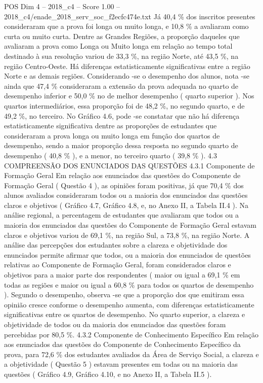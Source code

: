 \begin{textsample}{POS Dim 4 – 2018\_c4 – Score 1.00 – 2018\_c4/enade\_2018\_serv\_soc\_f2ecfc474e.txt}
Já 40,4 \% dos inscritos presentes consideraram que a prova foi longa ou muito longa, e 10,8 \% a avaliaram como curta ou muito curta.
Dentre as Grandes Regiões, a proporção daqueles que avaliaram a prova como Longa ou Muito longa em relação ao tempo total destinado à sua resolução variou de 33,3 \%, na região Norte, até 43,5 \%, na região Centro-Oeste.
Há diferenças estatisticamente significativas entre a região Norte e as demais regiões.
Considerando -se o desempenho dos alunos, nota -se ainda que 47,4 \% consideraram a extensão da prova adequada no quarto de desempenho inferior e 50,0 \% no de melhor desempenho ( quarto superior ).
Nos quartos intermediários, essa proporção foi de 48,2 \%, no segundo quarto, e de 49,2 \%, no terceiro.
No Gráfico 4.6, pode -se constatar que não há diferença estatisticamente significativa dentre as proporções de estudantes que consideraram a prova longa ou muito longa em função dos quartos de desempenho, sendo a maior proporção dessa resposta no segundo quarto de desempenho ( 40,8 \% ), e a menor, no terceiro quarto ( 39,8 \% ). 4.3 COMPREENSÃO DOS ENUNCIADOS DAS QUESTÕES 4.3.1 Componente de Formação Geral Em relação aos enunciados das questões do Componente de Formação Geral ( Questão 4 ), as opiniões foram positivas, já que 70,4 \% dos alunos avaliados consideraram todos ou a maioria dos enunciados das questões claros e objetivos ( Gráfico 4.7, Gráfico 4.8, e, no Anexo II, a Tabela II.4 ).
Na análise regional, a percentagem de estudantes que avaliaram que todos ou a maioria dos enunciados das questões do Componente de Formação Geral estavam claros e objetivos variou de 69,1 \%, na região Sul, a 73,8 \%, na região Norte.
A análise das percepções dos estudantes sobre a clareza e objetividade dos enunciados permite afirmar que todos, ou a maioria dos enunciados de questões relativas ao Componente de Formação Geral, foram considerados claros e objetivos para a maior parte dos respondentes ( maior ou igual a 69,1 \% em todas as regiões e maior ou igual a 60,8 \% para todos os quartos de desempenho ).
Segundo o desempenho, observa -se que a proporção dos que emitiram essa opinião cresce conforme o desempenho aumenta, com diferenças estatisticamente significativas entre os quartos de desempenho.
No quarto superior, a clareza e objetividade de todos ou da maioria dos enunciados das questões foram percebidas por 80,5 \%. 4.3.2 Componente de Conhecimento Específico Em relação aos enunciados das questões do Componente de Conhecimento Específico da prova, para 72,6 \% dos estudantes avaliados da Área de Serviço Social, a clareza e a objetividade ( Questão 5 ) estavam presentes em todas ou na maioria das questões ( Gráfico 4.9, Gráfico 4.10, e no Anexo II, a Tabela II.5 ).

\end{textsample}
